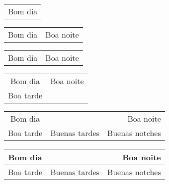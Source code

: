 \documentclass{article}
\begin{document}

  \begin{tabular}{c}
    Bom dia
  \end{tabular}

  \begin{tabular}{cl}
    Bom dia & Boa noite
  \end{tabular}

  \begin{tabular}{c | l}
    Bom dia & Boa noite
  \end{tabular}

  \begin{tabular}{c | l}
    Bom dia & Boa noite \\
    Boa tarde & %
  \end{tabular}

  \begin{tabular}{c | l | r}
    Bom dia &  & Boa noite \\
    Boa tarde & Buenas tardes & Buenas notches
  \end{tabular}
  
  \begin{tabular}{c | l | r}
    \hline  %
	  Bom dia   &               & Boa noite      \\ \hline %
    Boa tarde & Buenas tardes & Buenas notches \\ %
    \hline %
\end{tabular}
\end{document}
